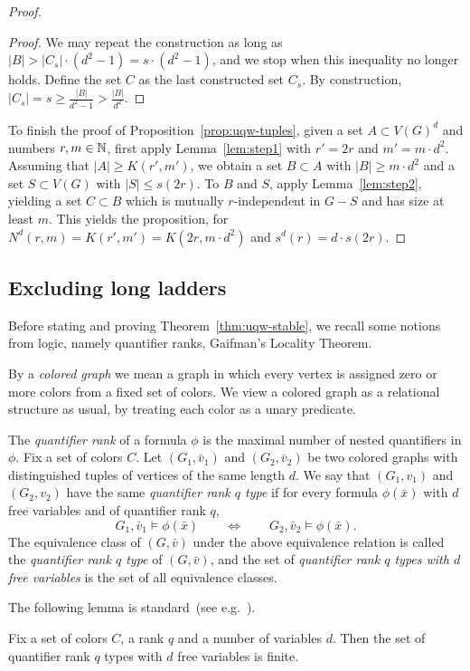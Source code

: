 \begin{proof}
\begin{proof}
We may repeat the construction as long as $|B|>|C_s|\cdot (d^2-1)=s\cdot (d^2-1)$, and we stop when this inequality no longer holds. Define the set $C$ as the last constructed set $C_s$.
By construction, $|C_s|=s\ge 
\frac{|B|}{d^2-1}>\frac{|B|}{d^2}$.	
\end{proof}

To finish the proof of Proposition~\ref{prop:uqw-tuples},
given a set $A\subset V(G)^d$ and numbers $r,m\in\mathbb{N}$,
first apply 
Lemma~\ref{lem:step1} 
  with $r'=2r$ and
 $m'= m\cdot d^2$.
 Assuming that $|A|\ge K(r',m')$, 
we obtain a set $B\subset A$ with $|B|\ge m\cdot d^2$ and a set $S\subset V(G)$ with $|S|\le s(2r)$.
To $B$ and $S$, apply Lemma~\ref{lem:step2}, yielding a set $C\subset B$ which is mutually $r$-independent in $G-S$ and has size at least $m$. This yields the proposition, for $N^d(r,m)=K(r',m')=K(2r,m\cdot d^2)$
and $s^d(r)=d\cdot s(2r)$.
\end{proof}


\subsection{Excluding long ladders}
\label{sec:uqw-stable}

Before stating and proving Theorem~\ref{thm:uqw-stable}, we recall some notions from logic, namely quantifier ranks, Gaifman's Locality Theorem.


By a \emph{colored graph} we mean a graph  in which 
every vertex is assigned zero or more colors from a fixed set of colors. We view a colored graph as a relational structure as usual, by treating each color as a unary predicate. 

The \emph{quantifier rank} of a formula $\phi$ is the maximal number of nested quantifiers in $\phi$. Fix a set of colors $C$.
Let $(G_1,\bar v_1)$ and $(G_2,\bar v_2)$ be two
colored graphs with distinguished tuples of vertices of the same length $d$. We say that $(G_1,v_1)$ and $(G_2,v_2)$
have the same \emph{quantifier rank $q$ type}
if for every formula $\phi(\bar x)$ with $d$ free variables and of quantifier rank $q$,
 $$G_1,\bar v_1\models \phi(\bar x)\qquad\iff \qquad G_2,\bar v_2\models \phi(\bar x).$$
 The equivalence class of $(G,\bar v)$ under the above equivalence relation is called the \emph{quantifier rank $q$ type} of $(G,\bar v)$, and  the set of \emph{quantifier rank $q$ types with $d$ free variables}
is the set of all equivalence classes.

The following lemma is standard~(see e.g.~\cite{libkin}).
\begin{lemma}\label{lem:q-types}
	Fix a set of colors $C$, a rank $q$ and a number of variables $d$.
	Then the set of quantifier rank $q$ types with $d$ free variables is finite.
\end{lemma}


